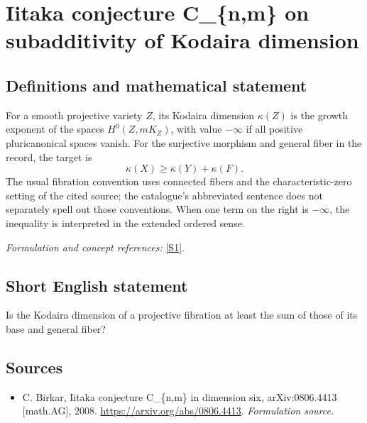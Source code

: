 \documentclass[11pt]{article}
\begin{document}
\section*{\texorpdfstring{Iitaka conjecture C\_\{n,m\} on subadditivity of Kodaira dimension}{Iitaka conjecture C\_\{n,m\} on subadditivity of Kodaira dimension}}\label{114}
\subsection{Definitions and mathematical statement}
For a smooth projective variety $Z$, its Kodaira dimension $\kappa(Z)$ is the growth exponent of the spaces $H^0(Z,mK_Z)$, with value $-\infty$ if all positive pluricanonical spaces vanish. For the surjective morphism and general fiber in the record, the target is
\[
 \kappa(X)\ge\kappa(Y)+\kappa(F).
\]
The usual fibration convention uses connected fibers and the characteristic-zero setting of the cited source; the catalogue's abbreviated sentence does not separately spell out those conventions. When one term on the right is $-\infty$, the inequality is interpreted in the extended ordered sense.
\par\smallskip\textit{Formulation and concept references:} \href{https://arxiv.org/abs/0806.4413}{[S1]}.

\subsection{Short English statement}
Is the Kodaira dimension of a projective fibration at least the sum of those of its base and general fiber?
\subsection{Sources}
\begin{itemize}
\item[S1]C. Birkar, Iitaka conjecture C\_\{n,m\} in dimension six, arXiv:0806.4413 [math.AG], 2008.
\url{https://arxiv.org/abs/0806.4413}.
\textit{Formulation source.}
\end{itemize}
\end{document}
